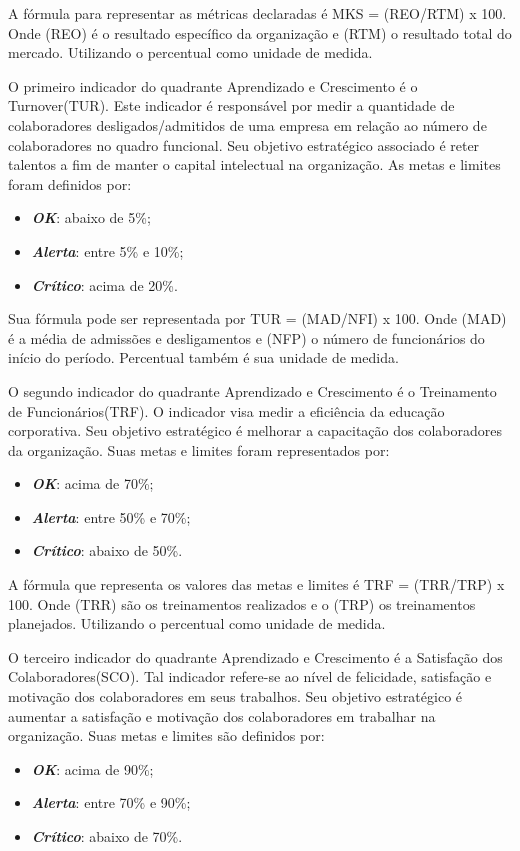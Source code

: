 \documentclass[
	12pt,				%
	openright,			%
	oneside,			%
	a4paper,			%
	english,			%
	brazil				%
	]{abntex2}
\begin{document}
A fórmula para representar as métricas declaradas é MKS = (REO/RTM) x 100. Onde (REO) é o resultado específico da organização e (RTM) o resultado total do mercado. Utilizando o percentual como unidade de medida.

O primeiro indicador do quadrante Aprendizado e Crescimento é o Turnover(TUR). Este indicador é responsável por medir a quantidade de colaboradores desligados/admitidos de uma empresa em relação ao número de colaboradores no quadro funcional. Seu objetivo estratégico associado é reter talentos a fim de manter o capital intelectual na organização. As metas e limites foram definidos por:
\begin{itemize}
\item  \textbf{\textit{OK}}: abaixo de 5\%;
\item  \textbf{\textit{Alerta}}: entre 5\% e 10\%;
\item  \textbf{\textit{Crítico}}: acima de 20\%.
\end{itemize}

Sua fórmula pode ser representada por TUR = (MAD/NFI) x 100. Onde (MAD) é a média de admissões e desligamentos e (NFP) o número de funcionários do início do período. Percentual também é sua unidade de medida.

O segundo indicador do quadrante Aprendizado e Crescimento é o Treinamento de Funcionários(TRF). O indicador visa medir a eficiência da educação corporativa. Seu objetivo estratégico é melhorar a capacitação dos colaboradores da organização. Suas metas e limites foram representados por:
\begin{itemize}
\item  \textbf{\textit{OK}}: acima de 70\%;
\item  \textbf{\textit{Alerta}}: entre 50\% e 70\%;
\item  \textbf{\textit{Crítico}}: abaixo de 50\%.
\end{itemize}
 
A fórmula que representa os valores das metas e limites é TRF = (TRR/TRP) x 100. Onde (TRR) são os treinamentos realizados e o (TRP) os treinamentos planejados. Utilizando o percentual como unidade de medida.

O terceiro indicador do quadrante Aprendizado e Crescimento é a Satisfação dos Colaboradores(SCO). Tal indicador refere-se ao nível de felicidade, satisfação e motivação dos colaboradores em seus trabalhos. Seu objetivo estratégico é aumentar a satisfação e motivação dos colaboradores em trabalhar na organização. Suas metas e limites são definidos por: 
\begin{itemize}
\item  \textbf{\textit{OK}}: acima de 90\%;
\item  \textbf{\textit{Alerta}}: entre 70\% e 90\%;
\item  \textbf{\textit{Crítico}}: abaixo de 70\%.
\end{itemize}
\end{document}
